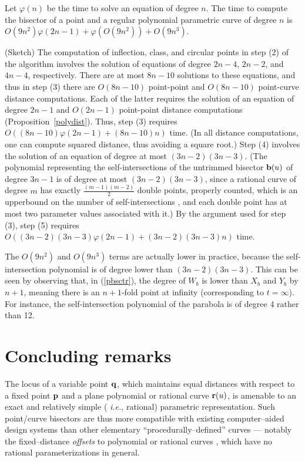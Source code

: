 \begin{thm}
Let $\varphi(n)$ be the time to solve an equation of degree $n$.
The time to compute the bisector of a point and a regular polynomial
parametric curve of degree $n$ is 
$O(9n^{2}) \varphi(2n-1) + \varphi(O(9n^2)) + O(9n^3)$.
\end{thm}
\prf (Sketch)
The computation of inflection, class, and circular points in step (2)
of the algorithm
involves the solution of equations of degree $2n-4$, $2n-2$, and $4n-4$,
respectively.
There are at most $8n-10$ solutions to these equations, and thus in step (3)
there are $O(8n-10)$ point-point and $O(8n-10)$ point-curve 
distance computations.
Each of the latter requires the solution of an equation of degree $2n-1$
and $O(2n-1)$ point-point distance computations (Proposition~\ref{polydist}).
Thus, step (3) requires $O(\mbox{$(8n-10)\varphi(2n-1)$} + \mbox{$(8n-10)n$})$ 
time.
(In all distance computations, one can compute squared distance,
thus avoiding a square root.)
Step (4) involves the solution of an equation of degree at most $(3n-2)(3n-3)$.
(The polynomial representing the self-intersections of the untrimmed
bisector ${\bf b}(u)$ of degree $3n-1$ is of degree at most $(3n-2)(3n-3)$,
since a rational curve of degree $m$ has exactly $\frac{(m-1)(m-2)}{2}$ 
double points, properly counted, which is an upperbound on the number of
self-intersections \cite{W50}, and 
each double point has at most two parameter values associated with it.)
By the argument used for step (3), step (5) requires
$O(\mbox{$(3n-2)(3n-3)$}\varphi(2n-1) + \mbox{$(3n-2)(3n-3)n$})$ time.
\QED

\begin{rmk}
The $O(9n^2)$ and $O(9n^3)$ terms are actually lower in practice, because the
self-intersection polynomial is of degree lower than $(3n-2)(3n-3)$.
This can be seen by observing that, in (\ref{pbsctr}),
the degree of $W_b$ is lower than $X_b$ and $Y_b$ by $n+1$,
meaning there is an $n+1$-fold point at infinity (corresponding to $t=\infty$).
For instance, the self-intersection polynomial of the parabola
is of degree 4 rather than 12.
\end{rmk}

\section{Concluding remarks}
\label{conclusion}

The locus of a variable point ${\bf q}$, which maintains equal distances with
respect to a fixed point ${\bf p}$ and a plane polynomial or rational
curve ${\bf r}(u)$, is amenable to an exact and relatively simple ({\it
i.e.}, rational) parametric representation. Such point/curve bisectors
are thus more compatible with existing computer--aided design systems
than other elementary ``procedurally--defined'' curves --- notably the
fixed--distance {\it offsets\/} to polynomial or rational curves \cite
{farouki90a,farouki90b}, which have no rational parameterizations in
general.

